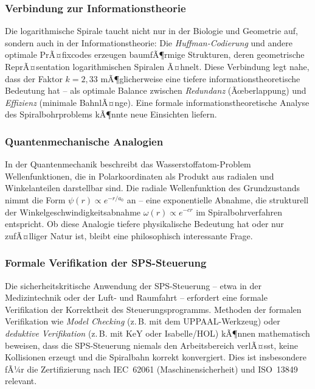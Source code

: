 ﻿\documentclass[12pt,a4paper]{article}
\begin{document}
\subsubsection{Verbindung zur Informationstheorie}

Die logarithmische Spirale taucht nicht nur in der Biologie und Geometrie auf, sondern auch in der Informationstheorie: Die \textit{Huffman-Codierung} und andere optimale PrÃ¤fixcodes erzeugen baumfÃ¶rmige Strukturen, deren geometrische ReprÃ¤sentation logarithmischen Spiralen Ã¤hnelt. Diese Verbindung legt nahe, dass der Faktor $k = 2{,}33$ mÃ¶glicherweise eine tiefere informationstheoretische Bedeutung hat -- als optimale Balance zwischen \textit{Redundanz} (Ãœberlappung) und \textit{Effizienz} (minimale BahnlÃ¤nge). Eine formale informationstheoretische Analyse des Spiralbohrproblems kÃ¶nnte neue Einsichten liefern.

\subsubsection{Quantenmechanische Analogien}

In der Quantenmechanik beschreibt das Wasserstoffatom-Problem Wellenfunktionen, die in Polarkoordinaten als Produkt aus radialen und Winkelanteilen darstellbar sind. Die radiale Wellenfunktion des Grundzustands nimmt die Form $\psi(r) \propto e^{-r/a_0}$ an -- eine exponentielle Abnahme, die strukturell der Winkelgeschwindigkeitsabnahme $\omega(r) \propto e^{-cr}$ im Spiralbohrverfahren entspricht. Ob diese Analogie tiefere physikalische Bedeutung hat oder nur zufÃ¤lliger Natur ist, bleibt eine philosophisch interessante Frage.

\subsubsection{Formale Verifikation der SPS-Steuerung}

Die sicherheitskritische Anwendung der SPS-Steuerung -- etwa in der Medizintechnik oder der Luft- und Raumfahrt -- erfordert eine formale Verifikation der Korrektheit des Steuerungsprogramms. Methoden der formalen Verifikation wie \textit{Model Checking} (z.\,B. mit dem UPPAAL-Werkzeug) oder \textit{deduktive Verifikation} (z.\,B. mit KeY oder Isabelle/HOL) kÃ¶nnen mathematisch beweisen, dass die SPS-Steuerung niemals den Arbeitsbereich verlÃ¤sst, keine Kollisionen erzeugt und die Spiralbahn korrekt konvergiert. Dies ist insbesondere fÃ¼r die Zertifizierung nach IEC~62061 (Maschinensicherheit) und ISO~13849 relevant.
\end{document}
